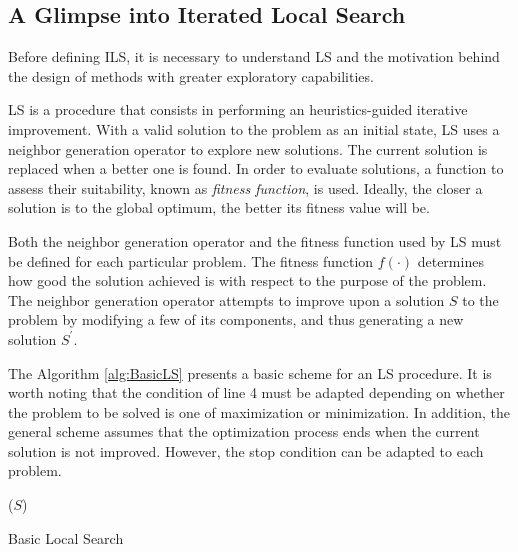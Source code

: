 \subsection{A Glimpse into Iterated Local Search}

Before defining \acs{ILS}, it is necessary to understand \acs{LS} and the motivation behind the design of methods with greater exploratory capabilities.

\acs{LS} is a procedure that consists in performing an heuristics-guided iterative improvement. With a valid solution to the problem as an initial state, \acs{LS} uses a neighbor generation operator to explore new solutions. The current solution is replaced when a better one is found. In order to evaluate solutions, a function to assess their suitability, known as \textit{fitness function}, is used. Ideally, the closer a solution is to the global optimum, the better its fitness value will be.

Both the neighbor generation operator and the fitness function used by \acs{LS} must be defined for each particular problem. The fitness function $f(\cdot)$ determines how good the solution achieved is with respect to the purpose of the problem. The neighbor generation operator attempts to improve upon a solution $S$ to the problem by modifying a few of its components, and thus generating a new solution $S^\prime$.

The Algorithm \ref{alg:BasicLS} presents a basic scheme for an \acs{LS} procedure. It is worth noting that the condition of line 4 must be adapted depending on whether the problem to be solved is one of maximization or minimization. In addition, the general scheme assumes that the optimization process ends when the current solution is not improved. However, the stop condition can be adapted to each problem.

\begin{algorithm}
	\SetNlSkip{0.5em}
	\BlankLine
	\BlankLine
	\KwRet ($S$)
	
	\caption{Basic Local Search}\label{alg:BasicLS}
\end{algorithm}

